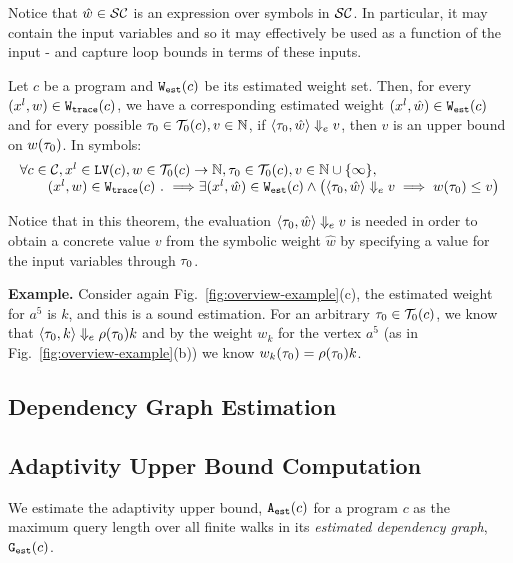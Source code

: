 Notice that $\hat{w} \in \mathcal{SC}$ is an expression over symbols in $\mathcal{SC}$. In particular, it may contain the input variables and so it may effectively be used as a function of the input - and capture loop bounds in terms of these inputs.
\begin{thm}
 \label{thm:addweight_soundness}
Let ${c}$ be a program and $\mathtt{{W_{est}}}(c)$ be its estimated weight set.
Then, for every  $(x^l, w) \in \mathtt{{W_{trace}}}(c) $,
we have a corresponding estimated weight $(x^l, \hat{w}) \in \mathtt{{W_{est}}}(c)$ and for every possible 
$\mathtt{\tau}_0 \in \mathcal{T}_0(c),
v \in \mathbb{N}$,
if $\langle \mathtt{\tau}_0, \hat{w} \rangle \Downarrow_e v$,
then $v$ is an upper bound on ${w}(\mathtt{\tau}_0)$. In symbols:
\[
 \begin{array}{l}
 \forall c \in \mathcal{C}, x^l \in \mathtt{LV}(c),w\in \mathcal{T}_0(c)\to \mathbb{N},\mathtt{\tau}_0 \in \mathcal{T}_0(c), 
v \in \mathbb{N}\cup \{\infty\}, 
\\ \qquad
(x^l, w) \in \mathtt{{W_{trace}}}(c) ~.~ \Longrightarrow
\exists
(x^l, \hat{w}) \in \mathtt{{W_{est}}}(c) 
\land
\big(
 \langle \mathtt{\tau}_0, \hat{w} \rangle \Downarrow_e v \implies w(\mathtt{\tau}_0) \leq v
\big)
\end{array}
\]
\end{thm}
Notice that in this theorem, the evaluation $\langle \mathtt{\tau}_0, \hat{w} \rangle \Downarrow_e v$ is needed in order to obtain a concrete value $v$ from the symbolic weight $\hat{w}$ by specifying a value for the input variables through $\mathtt{\tau}_0$.


\textbf{Example.} 
Consider again
Fig.~\ref{fig:overview-example}(c),
the estimated weight for $a^5$ is $k$, and this is a sound estimation.
For an arbitrary $\mathtt{\tau}_0 \in \mathcal{T}_0(c)$, we know that $\langle \mathtt{\tau}_0, k \rangle \Downarrow_e \rho(\mathtt{\tau}_0) k$ and
by the weight $w_k$ for the vertex $a^5$ (as in Fig.~\ref{fig:overview-example}(b)) we know 
$w_k(\mathtt{\tau}_0) = \rho(\mathtt{\tau}_0) k$. 
%
\subsection{Dependency Graph Estimation}

\subsection{Adaptivity Upper Bound Computation}
\label{sec:alg_adaptcompute}
We estimate the adaptivity upper bound, ${\mathtt{A_{est}}}(c)$ for a program $c$ as the maximum query length over all finite walks in its \emph{estimated dependency graph}, $\mathtt{{G_{est}}}({c})$.
%


